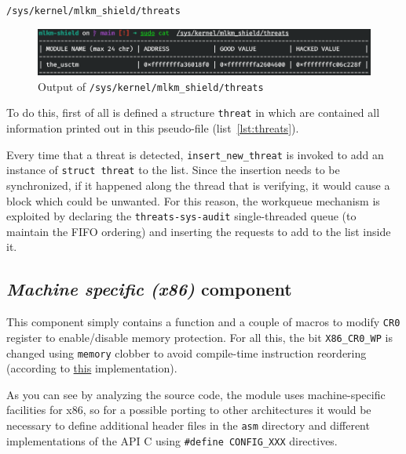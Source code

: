 \documentclass{article}
\begin{document}
	\centerline{\texttt{/sys/kernel/mlkm\_shield/threats}}

	\begin{figure}[!htbp]
		\centering
		\includegraphics[scale=0.4]{threats}
		\caption{Output of \texttt{/sys/kernel/mlkm\_shield/threats}}
		\label{fig:threats}
	\end{figure}

	To do this, first of all is defined a structure \texttt{threat} in which are contained all information printed out
	in this pseudo-file (list~\ref{lst:threats}).

	Every time that a threat is detected, \texttt{insert\_new\_threat} is invoked to add an instance of \texttt{struct
	threat} to the list. Since the insertion needs to be synchronized, if it happened along the thread that is
	verifying, it would cause a block which could be unwanted. For this reason, the workqueue mechanism is exploited by
	declaring the \texttt{threats-sys-audit} single-threaded queue (to maintain the FIFO ordering) and inserting the
	requests to add to the list inside it.

	\subsection{\emph{Machine specific (x86)} component}\label{sec:x86}
	This component simply contains a function and a couple of macros to modify \texttt{CR0} register to enable/disable
	memory protection. For all this, the bit \texttt{X86\_CR0\_WP} is changed using \texttt{memory} clobber to avoid
	compile-time instruction reordering (according to
	\href{https://elixir.bootlin.com/linux/v5.17.3/source/arch/x86/include/asm/special_insns.h#L54}{this}
	implementation).

	As you can see by analyzing the source code, the module uses machine-specific facilities for x86, so for a possible
	porting to other architectures it would be necessary to define additional header files in the \texttt{asm}
	directory and different implementations of the API C using \texttt{\#define CONFIG\_XXX} directives.
\end{document}
